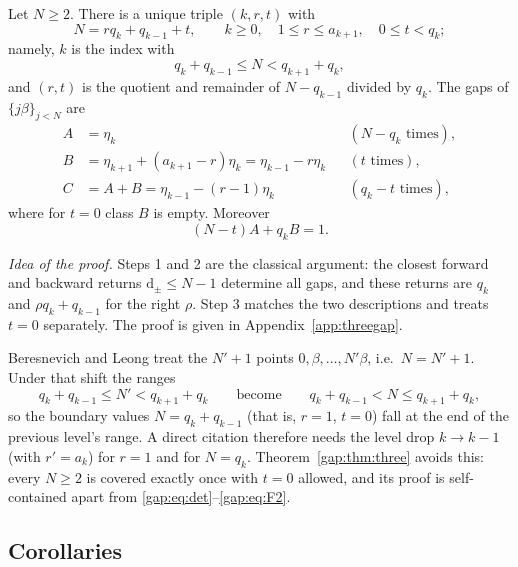 \begin{theorem}\label{gap:thm:three}
Let $N\ge2$. There is a unique triple $(k,r,t)$ with
\begin{equation}\label{gap:eq:decomp}
N=rq_k+q_{k-1}+t,\qquad k\ge0,\quad 1\le r\le a_{k+1},\quad 0\le t<q_k;
\end{equation}
namely, $k$ is the index with
\[
q_k+q_{k-1}\le N<q_{k+1}+q_k,
\]
and $(r,t)$ is the quotient and remainder of $N-q_{k-1}$ divided by $q_k$.
The gaps of $\{j\beta\}_{j<N}$ are
\begin{align*}
A&=\eta_k &&(N-q_k\text{ times}),\\
B&=\eta_{k+1}+(a_{k+1}-r)\eta_k=\eta_{k-1}-r\eta_k &&(t\text{ times}),\\
C&=A+B=\eta_{k-1}-(r-1)\eta_k &&(q_k-t\text{ times}),
\end{align*}
where for $t=0$ class $B$ is empty. Moreover
\begin{equation}\label{gap:eq:AB}
(N-t)A+q_kB=1.
\end{equation}
\end{theorem}

\emph{Idea of the proof.} Steps 1 and 2 are the classical argument: the closest forward and backward returns $\mathrm d_\pm\le N-1$ determine all gaps, and these returns are $q_k$ and $\rho q_k+q_{k-1}$ for the right $\rho$. Step 3 matches the two descriptions and treats $t=0$ separately. The proof is given in Appendix~\ref{app:threegap}.

\begin{remark}
Beresnevich and Leong \cite[Thm.~3]{Leong17} treat the $N'+1$ points $0,\beta,\dots,N'\beta$, i.e.\ $N=N'+1$.
Under that shift the ranges
\[
q_k+q_{k-1}\le N'<q_{k+1}+q_k
\qquad\text{become}\qquad
q_k+q_{k-1}<N\le q_{k+1}+q_k,
\]
so the boundary values $N=q_k+q_{k-1}$ (that is, $r=1$, $t=0$) fall at the end of the previous level's range.
A direct citation therefore needs the level drop $k\to k-1$ (with $r'=a_k$) for $r=1$ and for $N=q_k$.
Theorem~\ref{gap:thm:three} avoids this: every $N\ge2$ is covered exactly once with $t=0$ allowed,
and its proof is self-contained apart from \eqref{gap:eq:det}--\eqref{gap:eq:F2}.
\end{remark}

\subsection{Corollaries}\label{gap:sec:cor}

